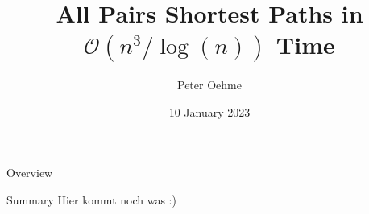 

\author{Peter Oehme}
\title{All Pairs Shortest Paths in \texorpdfstring{$\mathcal{O}(n^3 / \log(n))$}{O (n \^{} 3 / log (n))} Time}
\date{10 January 2023}




\begin{frame}
    \maketitle
\end{frame}

\begin{frame}{Overview}
    \tableofcontents
\end{frame}






\begin{frame}{Summary}
    Hier kommt noch was :)
\end{frame}


